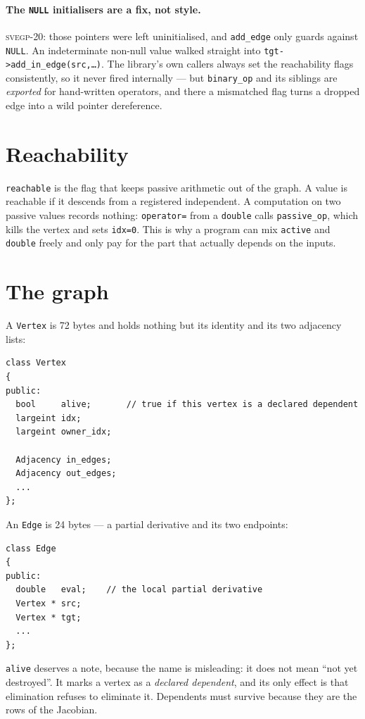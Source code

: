 \documentclass[11pt,a4paper]{report}
\newcommand{\svegp}[1]{\textsc{svegp-#1}}
\newcommand{\code}[1]{\texttt{#1}}
\begin{document}
\paragraph{The \code{NULL} initialisers are a fix, not style.} \svegp{20}:
those pointers were left uninitialised, and \code{add\_edge} only guards against
\code{NULL}. An indeterminate non-null value walked straight into
\code{tgt->add\_in\_edge(src,\dots)}. The library's own callers always set the
reachability flags consistently, so it never fired internally --- but
\code{binary\_op} and its siblings are \emph{exported} for hand-written
operators, and there a mismatched flag turns a dropped edge into a wild pointer
dereference.

\section{Reachability}

\code{reachable} is the flag that keeps passive arithmetic out of the graph. A
value is reachable if it descends from a registered independent. A computation
on two passive values records nothing: \code{operator=} from a \code{double}
calls \code{passive\_op}, which kills the vertex and sets \code{idx=0}. This is
why a program can mix \code{active} and \code{double} freely and only pay for
the part that actually depends on the inputs.

\section{The graph}

A \code{Vertex} is 72 bytes and holds nothing but its identity and its two
adjacency lists:

\begin{lstlisting}
class Vertex
{
public:
  bool     alive;       // true if this vertex is a declared dependent
  largeint idx;
  largeint owner_idx;

  Adjacency in_edges;
  Adjacency out_edges;
  ...
};
\end{lstlisting}

An \code{Edge} is 24 bytes --- a partial derivative and its two endpoints:

\begin{lstlisting}
class Edge
{
public:
  double   eval;    // the local partial derivative
  Vertex * src;
  Vertex * tgt;
  ...
};
\end{lstlisting}

\code{alive} deserves a note, because the name is misleading: it does not mean
``not yet destroyed''. It marks a vertex as a \emph{declared dependent}, and its
only effect is that elimination refuses to eliminate it. Dependents must survive
because they are the rows of the Jacobian.
\end{document}
